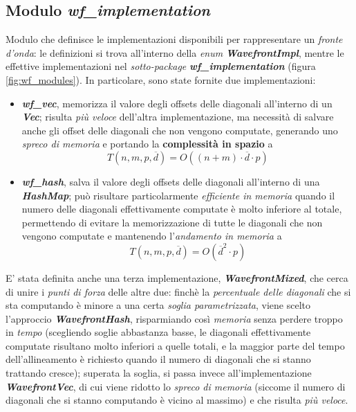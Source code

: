 \subsection{Modulo \textit{wf\_implementation}}
    Modulo che definisce le implementazioni disponibili per rappresentare un \emph{fronte d'onda}: le definizioni si trova all'interno della \emph{enum} \textbf{\textit{WavefrontImpl}}, mentre le effettive implementazioni nel \emph{sotto-package} \textbf{\textit{wf\_implementation}} (figura \ref{fig:wf_modules}). In particolare, sono state fornite due implementazioni:
    \begin{itemize}
        \item \textbf{\textit{wf\_vec}}, memorizza il valore degli offsets delle diagonali all'interno di un \textbf{\textit{Vec}}; risulta \emph{più veloce} dell'altra implementazione, ma necessità di salvare anche gli offset delle diagonali che non vengono computate, generando uno \emph{spreco di memoria} e portando la \textbf{complessità in spazio} a 
        \begin{equation}
            T(n, m, p, \overline{d}) = O((n+m) \cdot \overline{d} \cdot p)
            \label{equation:space_complexity_wf_vec}
        \end{equation}
        \item \textbf{\textit{wf\_hash}}, salva il valore degli offsets delle diagonali all'interno di una \textbf{\textit{HashMap}}; può risultare particolarmente \emph{efficiente in memoria} quando il numero delle diagonali effettivamente computate è molto inferiore al totale, permettendo di evitare la memorizzazione di tutte le diagonali che non vengono computate e mantenendo l'\emph{andamento in memoria} a 
        \begin{equation}
            T(n, m, p, \overline{d}) = O(\overline{d}^2 \cdot p)
            \label{equation:space_complexity_wf_hash}
        \end{equation}
    \end{itemize}
    E' stata definita anche una terza implementazione, \textbf{\textit{WavefrontMixed}}, che cerca di unire i \emph{punti di forza} delle altre due: finchè la \emph{percentuale delle diagonali} che si sta computando è minore a una certa \textit{soglia parametrizzata}, viene scelto l'approccio \textbf{\textit{WavefrontHash}}, risparmiando così \emph{memoria} senza perdere troppo in \emph{tempo} (scegliendo soglie abbastanza basse, le diagonali effettivamente computate risultano molto inferiori a quelle totali, e la maggior parte del tempo dell'allineamento è richiesto quando il numero di diagonali che si stanno trattando cresce); superata la soglia, si passa invece all'implementazione \textbf{\textit{WavefrontVec}}, di cui viene ridotto lo \emph{spreco di memoria} (siccome il numero di diagonali che si stanno computando è vicino al massimo) e che risulta \emph{più veloce}.  
    

